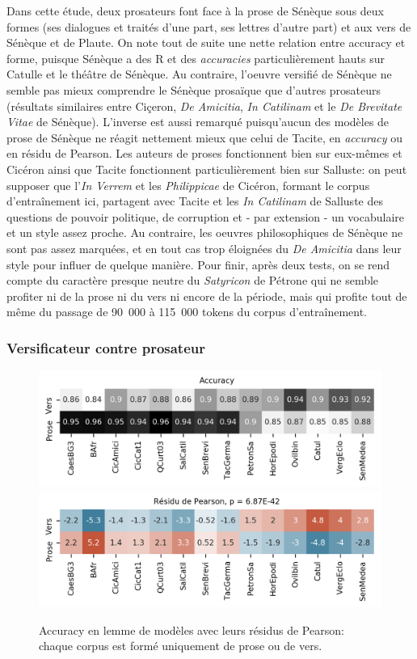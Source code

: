 Dans cette étude, deux prosateurs font face à la prose de Sénèque sous deux formes (ses dialogues et traités d'une part, ses lettres d'autre part) et aux vers de Sénèque et de Plaute. On note tout de suite une nette relation entre accuracy et forme, puisque Sénèque a des R et des \textit{accuracies} particulièrement hauts sur Catulle et le théâtre de Sénèque. Au contraire, l'oeuvre versifié de Sénèque ne semble pas mieux comprendre le Sénèque prosaïque que d'autres prosateurs (résultats similaires entre Ciçeron, \textit{De Amicitia}, \textit{In Catilinam} et le \textit{De Brevitate Vitae} de Sénèque). L'inverse est aussi remarqué puisqu'aucun des modèles de prose de Sénèque ne réagit nettement mieux que celui de Tacite, en \textit{accuracy} ou en résidu de Pearson. Les auteurs de proses fonctionnent bien sur eux-mêmes et Cicéron ainsi que Tacite fonctionnent particulièrement bien sur Salluste: on peut supposer que l'\textit{In Verrem} et les \textit{Philippicae} de Cicéron, formant le corpus d'entraînement ici, partagent avec Tacite et les \textit{In Catilinam} de Salluste des questions de pouvoir politique, de corruption et - par extension - un vocabulaire et un style assez proche. Au contraire, les oeuvres philosophiques de Sénèque ne sont pas assez marquées, et en tout cas trop éloignées du \textit{De Amicitia} dans leur style pour influer de quelque manière. Pour finir, après deux tests, on se rend compte du caractère presque neutre du \textit{Satyricon} de Pétrone qui ne semble profiter ni de la prose ni du vers ni encore de la période, mais qui profite tout de même du passage de 90~000 à 115~000 tokens du corpus d'entraînement.

\subsubsection{Versificateur contre prosateur}

\begin{figure}[ht]
    \centering
    \includegraphics[width=0.7\linewidth]{results/lemmatisation/longreeVariante/LongreeVariante-AccuracyModeDExpression-Lemme.png}
    \includegraphics[width=0.7\linewidth]{results/lemmatisation/longreeVariante/LongreeVariante-AssocPlotModeDExpression-Lemme.png}
    \caption{Accuracy en lemme de modèles avec leurs résidus de Pearson: chaque corpus est formé uniquement de prose ou de vers.}
    \label{fig:lemmatisation:longree:proseVSvers}
\end{figure}

